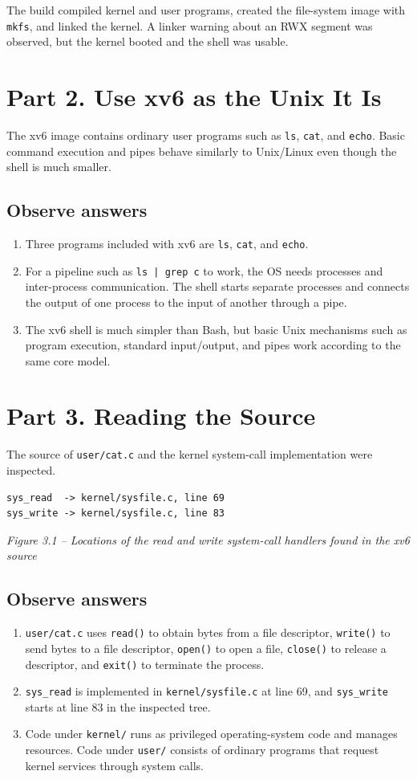 \documentclass[12pt,a4paper]{article}
\newcommand{\figcap}[1]{\begin{center}\small\textit{#1}\end{center}\vspace{0.4em}}
\begin{document}
The build compiled kernel and user programs, created the file-system image with \texttt{mkfs}, and linked the kernel. A linker warning about an RWX segment was observed, but the kernel booted and the shell was usable.

\section{Part 2. Use xv6 as the Unix It Is}
The xv6 image contains ordinary user programs such as \texttt{ls}, \texttt{cat}, and \texttt{echo}. Basic command execution and pipes behave similarly to Unix/Linux even though the shell is much smaller.

\subsection{Observe answers}
\begin{enumerate}[label=\arabic*.]
\item Three programs included with xv6 are \texttt{ls}, \texttt{cat}, and \texttt{echo}.
\item For a pipeline such as \texttt{ls | grep c} to work, the OS needs processes and inter-process communication. The shell starts separate processes and connects the output of one process to the input of another through a pipe.
\item The xv6 shell is much simpler than Bash, but basic Unix mechanisms such as program execution, standard input/output, and pipes work according to the same core model.
\end{enumerate}

\section{Part 3. Reading the Source}
The source of \texttt{user/cat.c} and the kernel system-call implementation were inspected.
\begin{lstlisting}
sys_read  -> kernel/sysfile.c, line 69
sys_write -> kernel/sysfile.c, line 83
\end{lstlisting}
\figcap{Figure 3.1 -- Locations of the read and write system-call handlers found in the xv6 source}

\subsection{Observe answers}
\begin{enumerate}[label=\arabic*.]
\item \texttt{user/cat.c} uses \texttt{read()} to obtain bytes from a file descriptor, \texttt{write()} to send bytes to a file descriptor, \texttt{open()} to open a file, \texttt{close()} to release a descriptor, and \texttt{exit()} to terminate the process.
\item \texttt{sys\_read} is implemented in \texttt{kernel/sysfile.c} at line 69, and \texttt{sys\_write} starts at line 83 in the inspected tree.
\item Code under \texttt{kernel/} runs as privileged operating-system code and manages resources. Code under \texttt{user/} consists of ordinary programs that request kernel services through system calls.
\end{enumerate}
\end{document}
